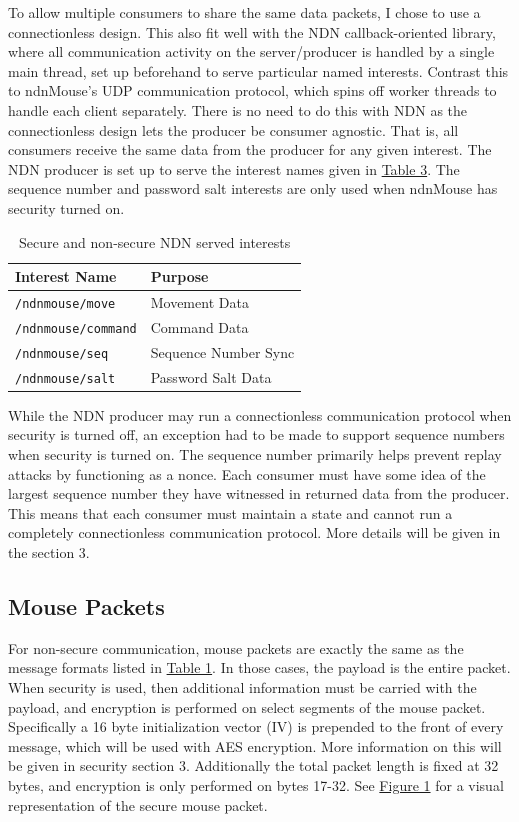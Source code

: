 \documentclass{sig-alternate}
\renewcommand\_{\textunderscore\allowbreak}  %
\begin{document}
To allow multiple consumers to share the same data packets, I chose to use a connectionless design. This also fit well with the NDN callback-oriented library, where all communication activity on the server/producer is handled by a single main thread, set up beforehand to serve particular named interests. Contrast this to ndnMouse's UDP communication protocol, which spins off worker threads to handle each client separately. There is no need to do this with NDN as the connectionless design lets the producer be consumer agnostic. That is, all consumers receive the same data from the producer for any given interest. The NDN producer is set up to serve the interest names given in \hyperlink{tab:ndnInterestNames}{Table 3}. The sequence number and password salt interests are only used when ndnMouse has security turned on.

\begin{table}
	\hypertarget{tab:ndnInterestNames}{}
	\begin{center}
		\begin{tabular}{| l | l |}
			\hline
			 Interest Name & Purpose \\ \hline\hline
			\texttt{/ndnmouse/move} & Movement Data\\ \hline
			\texttt{/ndnmouse/command} & Command Data\\ \hline
			\texttt{/ndnmouse/seq} & Sequence Number Sync\\ \hline
			\texttt{/ndnmouse/salt} & Password Salt Data\\ \hline
		\end{tabular}
		\caption{Secure and non-secure NDN served interests}
	\end{center}
\end{table}

While the NDN producer may run a connectionless communication protocol when security is turned off, an exception had to be made to support sequence numbers when security is turned on. The sequence number primarily helps prevent replay attacks by functioning as a nonce. Each consumer must have some idea of the largest sequence number they have witnessed in returned data from the producer. This means that each consumer must maintain a state and cannot run a completely connectionless communication protocol. More details will be given in the section 3.

\subsection{Mouse Packets}
For non-secure communication, mouse packets are exactly the same as the message formats listed in \hyperlink{tab:msgFormat}{Table 1}. In those cases, the payload is the entire packet. When security is used, then additional information must be carried with the payload, and encryption is performed on select segments of the mouse packet. Specifically a 16 byte initialization vector (IV) is prepended to the front of every message, which will be used with AES encryption. More information on this will be given in security section 3. Additionally the total packet length is fixed at 32 bytes, and encryption is only performed on bytes 17-32. See \hyperlink{fig:mousePacketDescription}{Figure 1} for a visual representation of the secure mouse packet.
\end{document}
